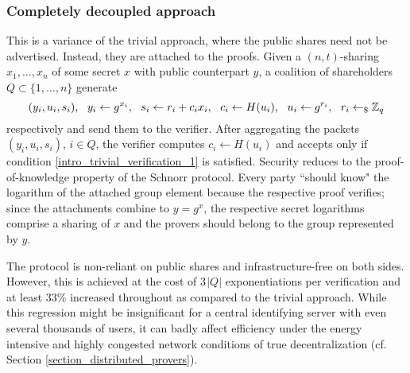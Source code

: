 \documentclass{iacrtrans}
\begin{document}
\subsubsection{Completely decoupled approach}\label{section_decoupled_commitment}

This is a variance of the trivial approach,
where the public shares
need not be advertised.
Instead, they are attached to the proofs.
Given a $(n, t)$-sharing
$x_1, \dots, x_n$ of some secret $x$
with public counterpart $y$,
a coalition of shareholders
$Q \subset \{1, \dots, n\}$
generate
\vspace{5pt}
\begin{equation*}
(y_i, u_i, s_i),
\ \ y_i \leftarrow g ^ {x_i},
\ \ s_i \leftarrow r_i + c_i x_i,
\ \ c_i \leftarrow H(u_i),
\ \ u_i \leftarrow g ^ {r_i},
\ \ r_i \leftarrow_\$ \mathbb{Z}_q
\vspace{5pt}
\end{equation*}
respectively
and send them to the verifier.
After aggregating the packets
$(y_i, u_i, s_i)$, $i \in Q$,
the verifier computes $c_i \leftarrow H(u_i)$
and accepts only if condition
\eqref{intro_trivial_verification_1}
is satisfied.
Security reduces to the proof-of-knowledge
property of the Schnorr protocol.
Every party ``should know"
the logarithm of the attached group element
because the respective proof verifies;
since the attachments combine to $y = g ^ x$,
the respective secret logarithms comprise a sharing of
$x$ and the provers should belong to the group
represented by $y$.

The protocol is non-reliant on public shares and
infrastructure-free on both sides.
However, this is achieved at the cost of
$3\hspace{1pt}|Q|$ exponentiations per verification
and at least $33\%$ increased throughout
as compared to the trivial approach.
While this regression might be insignificant
for a central identifying server
with even several thousands of users,
it can badly affect efficiency under
the energy intensive and
highly congested network conditions
of true decentralization
(cf. Section \ref{section_distributed_provers}).
\end{document}
